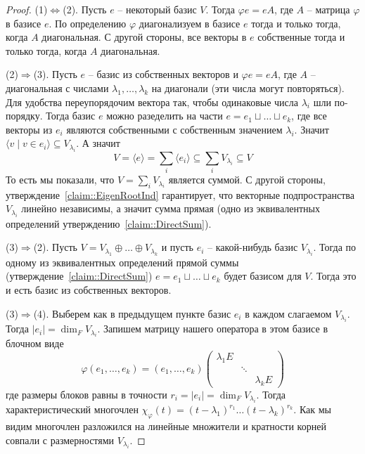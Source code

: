 \begin{proof}
(1)$\Leftrightarrow$(2).
Пусть $e$ -- некоторый базис $V$.
Тогда $\varphi e = e A$, где $A$ -- матрица $\varphi$ в базисе $e$.
По определению $\varphi$ диагонализуем в базисе $e$ тогда и только тогда, когда $A$ диагональная.
С другой стороны, все векторы в $e$ собственные тогда и только тогда, когда $A$ диагональная.

(2)$\Rightarrow$(3).
Пусть $e$ -- базис из собственных векторов и $\varphi e = e A$, где $A$ -- диагональная с числами $\lambda_1,\ldots,\lambda_k$ на диагонали (эти числа могут повторяться).
Для удобства переупорядочим вектора так, чтобы одинаковые числа $\lambda_i$ шли по-порядку.
Тогда базис $e$ можно разеделить на части $e = e_1 \sqcup \ldots \sqcup e_k$, где все векторы из $e_i$ являются собственными с собственным значением $\lambda_i$.
Значит $\langle v\mid v\in e_i\rangle\subseteq V_{\lambda_i}$.
А значит 
\[
V = \langle e \rangle = \sum_i \langle e_i\rangle \subseteq  \sum_i V_{\lambda_i} \subseteq V
\]
То есть мы показали, что $V = \sum_i V_{\lambda_i}$ является суммой.
С другой стороны, утверждение~\ref{claim::EigenRootInd} гарантирует, что векторные подпространства $V_{\lambda_i}$ линейно независимы, а значит сумма прямая (одно из эквивалентных определений утверждению~\ref{claim::DirectSum}).

(3)$\Rightarrow$(2).
Пусть $V = V_{\lambda_1}\oplus \ldots \oplus V_{\lambda_k}$ и пусть $e_i$ -- какой-нибудь базис $V_{\lambda_i}$.
Тогда по одному из эквивалентных определений прямой суммы (утверждение~\ref{claim::DirectSum}) $e = e_1 \sqcup\ldots \sqcup e_k$ будет базисом для $V$.
Тогда это и есть базис из собственных векторов.

(3)$\Rightarrow$(4).
Выберем как в предыдущем пункте базис $e_i$ в каждом слагаемом $V_{\lambda_i}$.
Тогда $|e_i| = \dim_F V_{\lambda_i}$.
Запишем матрицу нашего оператора в этом базисе в блочном виде
\[
\varphi(e_1,\ldots,e_k)
=
(e_1,\ldots,e_k)
\begin{pmatrix}
{\lambda_1 E}&{}&{}\\
{}&{\ddots}&{}\\
{}&{}&{\lambda_k E}
\end{pmatrix}
\]
где размеры блоков равны в точности $r_i=|e_i| = \dim_F V_{\lambda_i}$.
Тогда характеристический многочлен $\chi_\varphi(t) = (t-\lambda_1)^{r_1}\ldots(t-\lambda_k)^{r_k}$.
Как мы видим многочлен разложился на линейные множители и кратности корней совпали с размерностями $V_{\lambda_i}$.


\end{proof}
